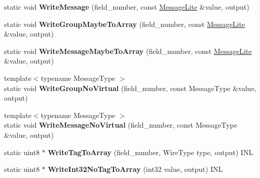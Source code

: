 \begin{DoxyCompactItemize}
static void {\bfseries Write\+Message} (field\+\_\+number, const \hyperlink{classgoogle_1_1protobuf_1_1MessageLite}{Message\+Lite} \&value, output)
\item 
\mbox{\label{classgoogle_1_1protobuf_1_1internal_1_1WireFormatLite_a28ba85accd650e0bb29375e84e5a59e4}} 
static void {\bfseries Write\+Group\+Maybe\+To\+Array} (field\+\_\+number, const \hyperlink{classgoogle_1_1protobuf_1_1MessageLite}{Message\+Lite} \&value, output)
\item 
\mbox{\label{classgoogle_1_1protobuf_1_1internal_1_1WireFormatLite_a8278bc20346ebef174faa2430656949e}} 
static void {\bfseries Write\+Message\+Maybe\+To\+Array} (field\+\_\+number, const \hyperlink{classgoogle_1_1protobuf_1_1MessageLite}{Message\+Lite} \&value, output)
\item 
\mbox{\label{classgoogle_1_1protobuf_1_1internal_1_1WireFormatLite_a5ed44eec564fcc33e7099bfe8e95b5c5}} 
{\footnotesize template$<$typename Message\+Type $>$ }\\static void {\bfseries Write\+Group\+No\+Virtual} (field\+\_\+number, const Message\+Type \&value, output)
\item 
\mbox{\label{classgoogle_1_1protobuf_1_1internal_1_1WireFormatLite_ac8edbcaee63ebf1db5b38a9ffd1b156c}} 
{\footnotesize template$<$typename Message\+Type $>$ }\\static void {\bfseries Write\+Message\+No\+Virtual} (field\+\_\+number, const Message\+Type \&value, output)
\item 
\mbox{\label{classgoogle_1_1protobuf_1_1internal_1_1WireFormatLite_ac9d4a8857fdce7e48b7dd53f3e436f09}} 
static uint8 $\ast$ {\bfseries Write\+Tag\+To\+Array} (field\+\_\+number, Wire\+Type type, output) I\+NL
\item 
\mbox{\label{classgoogle_1_1protobuf_1_1internal_1_1WireFormatLite_ade3f2cc014e7310defcef7164cea8e5c}} 
static uint8 $\ast$ {\bfseries Write\+Int32\+No\+Tag\+To\+Array} (int32 value, output) I\+NL
\item 

\end{DoxyCompactItemize}

